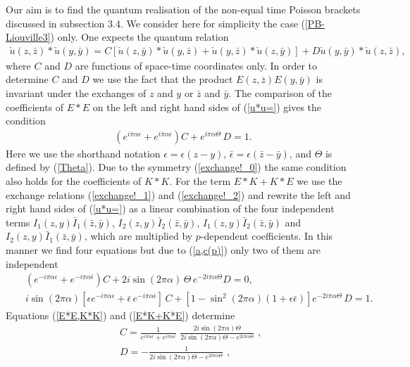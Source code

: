 \documentclass[a4paper,12pt]{article}
\begin{document}
Our aim  is to find the quantum realisation of the non-equal
time Poisson brackets discussed in subsection 3.4. We consider
here for simplicity the case (\ref{PB-Liouville3}) only.
One expects the quantum relation
\begin{eqnarray}\label{u*u=}
 \check u(z,\bar z)*\check u(y,\bar y)=
C[\check u(z,\bar y)*\check u(y,\bar z)+
\check u(y,\bar z)*\check u(z,\bar y)]+
D \check u(y,\bar y)*\check u(z,\bar z),
\end{eqnarray}
where $C$ and $D$ are functions of space-time coordinates only. In order to
determine $C$ and $D$ we use the fact that the product $E(z,\bar
z)E(y,\bar y)$ is invariant under the exchanges of $z$ and $y$ or
$\bar z$ and $\bar y$. The comparison of the coefficients of $E*E$ on
the left and right hand sides of (\ref{u*u=}) gives the condition
\begin{eqnarray}\label{E*E,K*K}
\left(e^{i\pi\alpha\epsilon}+
e^{i\pi\alpha\epsilon}\right)C+
e^{i\pi\alpha\Theta}\,D=1.
\end{eqnarray}
Here we use the shorthand notation $\epsilon=\epsilon(z-y)$,
$\bar\epsilon=\epsilon(\bar z-\bar y)$, and $\Theta$ is defined by
(\ref{Theta}).  Due to the symmetry (\ref{exchange!_0}) the same
condition also holds for the coefficients of $K*K$. For the term
$E*K+K*E$ we use the exchange relations (\ref{exchange!_1}) and
(\ref{exchange!_2}) and rewrite the left and right hand sides of
(\ref{u*u=}) as a linear combination of the
four independent terms $I_1(z,y)\bar
I_1(\bar z,\bar y)$, $I_2(z,y)\bar I_2(\bar z,\bar y)$, $I_1(z,y)\bar
I_2(\bar z,\bar y)$ and $I_2(z,y)\bar I_1(\bar z,\bar y)$, which are
multiplied by $p$-dependent coefficients. In this manner we find four
equations but due to (\ref{a,c(p)})
only two of them are independent
\begin{eqnarray}\label{E*K+K*E}
&&\left(e^{-i\pi\alpha\epsilon}+
e^{-i\pi\alpha\bar\epsilon}\right)C+2i\sin(2\pi\alpha)\,\Theta
\,e^{-2i\pi\alpha\Theta}D=0,\\
\label{E*K+K*E1}
&&i\sin(2\pi\alpha)\left[\epsilon e^{-i\pi\alpha\epsilon}
+\bar\epsilon\,e^{-i\pi\alpha\bar\epsilon}\right]\,C
+[1-\sin^2(2\pi\alpha)(1+\epsilon\bar\epsilon)]
e^{-2i\pi\alpha\Theta}\,D=1.
\end{eqnarray}
Equations (\ref{E*E,K*K}) and (\ref{E*K+K*E}) determine
\begin{eqnarray}\label{C,D}
&&C=\frac{1}{e^{i\pi\alpha\epsilon}+e^{i\pi\alpha\bar\epsilon}}\,\,
\frac{2i\sin(2\pi\alpha)\Theta}{2i\sin(2\pi\alpha)\Theta -
e^{2i\pi\alpha\Theta}}\,\,,
\nonumber \\
&&D=-\frac{1}{2i\sin(2\pi\alpha)\Theta - e^{2i\pi\alpha\Theta}}\,\,,
\end{eqnarray}
\end{document}

